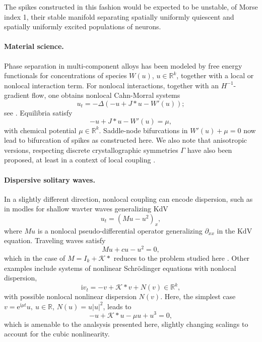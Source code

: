 \documentclass[10pt]{article}
\newcommand{\R}{\mathbb{R}}
\newcommand{\rme}{\mathrm{e}}
\newcommand{\rmi}{\mathrm{i}}
\newcommand{\K}{\mathcal{K}}
\begin{document}
The spikes constructed in this fashion would be expected to be unstable, of Morse index 1, their stable manifold separating spatially uniformly quiescent and spatially uniformly excited populations of neurons. 

\paragraph{Material science.} Phase separation in multi-component alloys has been modeled by free energy functionals for concentrations of species $W(u)$, $u\in \R^k$, together with a local or nonlocal interaction term. For nonlocal interactions, together with an $H^{-1}$-gradient flow, one obtains nonlocal Cahn-Morral systems
\[
u_t=-\Delta(-u+J*u-W'(u));
\]
see \cite{cahn-morral}. Equilibria satisfy 
\[
-u+J*u-W'(u)=\mu,
\]
with chemical potential $\mu\in\R^k$. Saddle-node bifurcations in $W'(u)+\mu=0$ now lead to bifurcation of spikes as constructed here. We also note that anisotropic versions, respecting discrete crystallographic symmetries $\Gamma$ have also been proposed, at least in a context of local coupling \cite{anisoCH}. 

\paragraph{Dispersive solitary waves.}
In a slightly different direction, nonlocal coupling can encode dispersion, such as in modles for shallow wavter waves generalizing KdV
\[
u_t=(Mu-u^2)_x,
\]
where $Mu$ is a nonlocal pseudo-differential operator generalizing $\partial_{xx}$ in the KdV equation. Traveling waves satisfy 
\[
Mu+cu-u^2=0,
\]
which in the case of $M=I_k+\K*$ reduces to the problem studied here \cite{waterwave}. Other examples include systems of nonlinear Schr\"odinger equations with nonlocal dispersion, 
\[
\rmi v_t=-v+\K*v + N(v)\in\R^k,
\]
with possible nonlocal nonlinear dispersion $N(v)$. Here, the simplest case $v=\rme^{\rmi\mu t}u,\ u\in\R$, $N(u)=u|u|^2$, leads to 
\[
-u+\K*u-\mu u + u^3=0,
\]
which is amenable to the analsysis presented here, slightly changing scalings to account for the cubic nonlinearity. 


% 
% 
% 
% 
\end{document}
